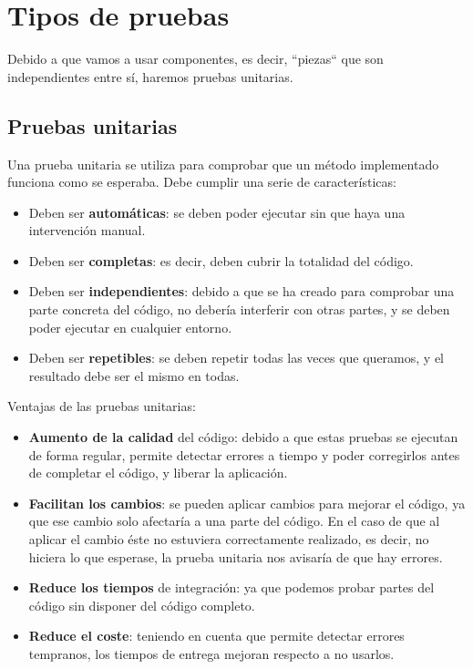 	
\section{Tipos de pruebas}
\label{cap3:sec:pruebas}

	Debido a que vamos a usar componentes, es decir, ``piezas`` que son independientes entre s\'i, haremos pruebas unitarias.

\subsection{Pruebas unitarias}

	Una prueba unitaria se utiliza para comprobar que un m\'etodo implementado funciona como se esperaba. Debe cumplir una serie de caracter\'isticas:
	
	\begin{itemize}
		\item Deben ser \textbf{autom\'aticas}: se deben poder ejecutar sin que haya una intervenci\'on manual.
		\item Deben ser \textbf{completas}: es decir, deben cubrir la totalidad del c\'odigo.
		\item Deben ser \textbf{independientes}: debido a que se ha creado para comprobar una parte concreta del c\'odigo, no deber\'ia interferir con otras partes, y se deben poder ejecutar en cualquier entorno.
		\item Deben ser \textbf{repetibles}: se deben repetir todas las veces que queramos, y el resultado debe ser el mismo en todas.
	\end{itemize}

	Ventajas de las pruebas unitarias:
	
	\begin{itemize}
		\item \textbf{Aumento de la calidad} del c\'odigo: debido a que estas pruebas se ejecutan de forma regular, permite detectar errores a tiempo y poder corregirlos antes de completar el c\'odigo, y liberar la aplicaci\'on.
		\item \textbf{Facilitan los cambios}: se pueden aplicar cambios para mejorar el c\'odigo, ya que ese cambio solo afectar\'ia a una parte del c\'odigo. En el caso de que al aplicar el cambio \'este no estuviera correctamente realizado, es decir, no hiciera lo que esperase, la prueba unitaria nos avisar\'ia de que hay errores.
		\item \textbf{Reduce los tiempos} de integraci\'on: ya que podemos probar partes del c\'odigo sin disponer del c\'odigo completo.
		\item \textbf{Reduce el coste}: teniendo en cuenta que permite detectar errores tempranos, los tiempos de entrega mejoran respecto a no usarlos.
	\end{itemize}
	
